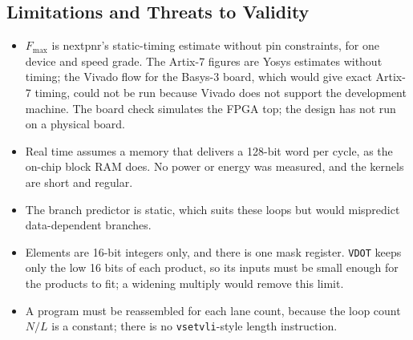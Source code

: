 \subsection{Limitations and Threats to Validity}
\begin{itemize}
\item $F_{\max}$ is nextpnr's static-timing estimate without pin constraints, for one
      device and speed grade. The Artix-7 figures are Yosys estimates without timing;
      the Vivado flow for the Basys-3 board, which would give exact Artix-7 timing, could
      not be run because Vivado does not support the development machine. The board
      check simulates the FPGA top; the design has not run on a physical board.
\item Real time assumes a memory that delivers a 128-bit word per cycle, as the on-chip
      block RAM does. No power or energy was measured, and the kernels are short and
      regular.
\item The branch predictor is static, which suits these loops but would mispredict
      data-dependent branches.
\item Elements are 16-bit integers only, and there is one mask register. \texttt{VDOT}
      keeps only the low 16 bits of each product, so its inputs must be small enough for
      the products to fit; a widening multiply would remove this limit.
\item A program must be reassembled for each lane count, because the loop count $N/L$ is
      a constant; there is no \texttt{vsetvli}-style length instruction.
\end{itemize}

